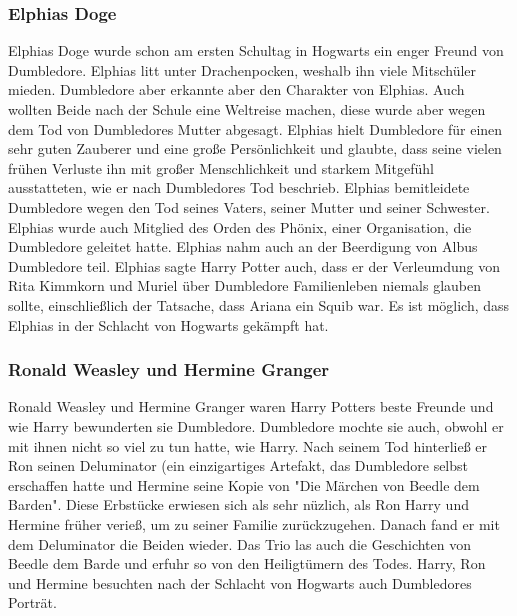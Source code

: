 \documentclass[a4paper, 10pt]{article}
\begin{document}
\subsubsection*{\large Elphias Doge}
Elphias Doge wurde schon am ersten Schultag in Hogwarts ein enger Freund von Dumbledore. Elphias litt unter Drachenpocken, weshalb ihn viele Mitschüler mieden. Dumbledore aber erkannte aber den Charakter von Elphias. Auch wollten Beide nach der Schule eine Weltreise machen, diese wurde aber wegen dem Tod von Dumbledores Mutter abgesagt. Elphias hielt Dumbledore für einen sehr guten Zauberer und eine große Persönlichkeit und glaubte, dass seine vielen frühen Verluste ihn mit großer Menschlichkeit und starkem Mitgefühl ausstatteten, wie er nach Dumbledores Tod beschrieb.
\vspace{10pt}
\newline
{}  
Elphias bemitleidete Dumbledore wegen den Tod seines Vaters, seiner Mutter und seiner Schwester. Elphias wurde auch Mitglied des Orden des Phönix, einer Organisation, die Dumbledore geleitet hatte. Elphias nahm auch an der Beerdigung von Albus Dumbledore teil.
\vspace{10pt}
\newline
{}  
Elphias sagte Harry Potter auch, dass er der Verleumdung von Rita Kimmkorn und Muriel über Dumbledore Familienleben niemals glauben sollte, einschließlich der Tatsache, dass Ariana ein Squib war. Es ist möglich, dass Elphias in der Schlacht von Hogwarts gekämpft hat.
\subsubsection*{\large Ronald Weasley und Hermine Granger}
Ronald Weasley und Hermine Granger waren Harry Potters beste Freunde und wie Harry bewunderten sie Dumbledore. Dumbledore mochte sie auch, obwohl er mit ihnen nicht so viel zu tun hatte, wie Harry.
\vspace{10pt}
\newline
{}  
Nach seinem Tod hinterließ er Ron seinen Deluminator (ein einzigartiges Artefakt, das Dumbledore selbst erschaffen hatte und Hermine seine Kopie von "Die Märchen von Beedle dem Barden". Diese Erbstücke erwiesen sich als sehr nüzlich, als Ron Harry und Hermine früher verieß, um zu seiner Familie zurückzugehen. Danach fand er mit dem Deluminator die Beiden wieder. Das Trio las auch die Geschichten von Beedle dem Barde und erfuhr so von den Heiligtümern des Todes. Harry, Ron und Hermine besuchten nach der Schlacht von Hogwarts auch Dumbledores Porträt.
\end{document}
